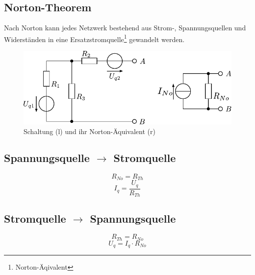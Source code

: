 \newpage
\subsection{Norton-Theorem}
Nach Norton kann jedes Netzwerk bestehend aus Strom-, Spannungsquellen und Widerständen in eine Ersatzstromquelle\footnote{Norton-Äqivalent} gewandelt werden.

\begin{figure}[h!]
\centering
\includegraphics[scale=\schscale]{../fig/norton_sch_2.pdf}
\caption{Schaltung (l) und ihr Norton-Äquivalent (r)}
\label{sch:norton}
\end{figure}

\subsection{Spannungsquelle $\rightarrow$ Stromquelle}
\[ R_{No} = R_{Th} \]
\[ I_q = \frac{U_q}{R_{Th}} \]

\subsection{Stromquelle $\rightarrow$ Spannungsquelle}
\[ R_{Th} = R_{No} \]
\[ U_q = I_q \cdot R_{No} \]
